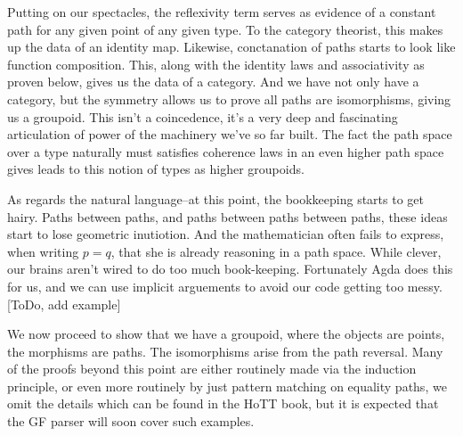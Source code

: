 \documentclass[11pt, a4paper]{article}
\begin{document}
Putting on our spectacles, the reflexivity term serves as evidence of a constant
path for any given point of any given type. To the category theorist, this makes
up the data of an identity map. Likewise, conctanation of paths starts to look
like function composition. This, along with the identity laws and associativity
as proven below, gives us the data of a category. And we have not only have a
category, but the symmetry allows us to prove all paths are isomorphisms, giving
us a groupoid. This isn't a coincedence, it's a very deep and fascinating
articulation of power of the machinery we've so far built. The fact the path
space over a type naturally must satisfies coherence laws in an even higher path
space gives leads to this notion of types as higher groupoids.

As regards the natural language--at this point, the bookkeeping starts to get
hairy. Paths between paths, and paths between paths between paths, these ideas
start to lose geometric inutiotion. And the mathematician often fails to
express, when writing $p= q$, that she is already reasoning in a path space.
While clever, our brains aren't wired to do too much book-keeping. Fortunately
Agda does this for us, and we can use implicit arguements to avoid our code
getting too messy. [ToDo, add example]

We now proceed to show that we have a groupoid, where the objects are points,
the morphisms are paths. The isomorphisms arise from the path reversal. Many of
the proofs beyond this point are either routinely made via the induction
principle, or even more routinely by just pattern matching on equality paths, we
omit the details which can be found in the HoTT book, but it is expected that
the GF parser will soon cover such examples.
\end{document}
